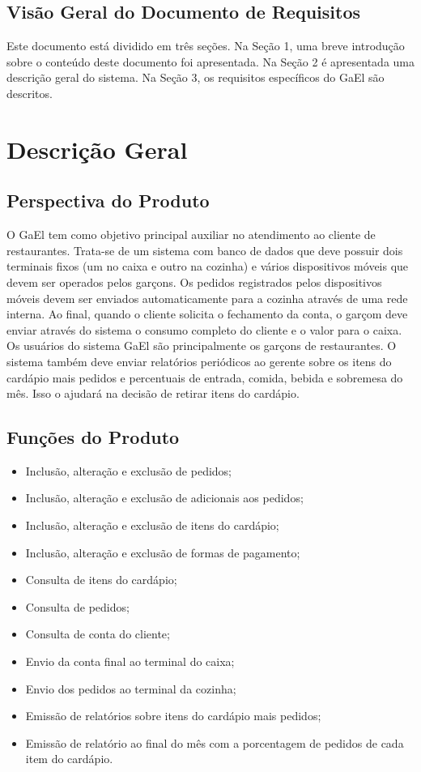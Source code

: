 \documentclass[11pt,a4paper]{article}
\begin{document}
\subsection{Visão Geral do Documento de Requisitos}

Este documento está dividido em três seções. Na Seção 1, uma breve introdução sobre o conteúdo deste documento foi apresentada. Na Seção 2 é apresentada uma descrição geral do sistema. Na Seção 3, os requisitos específicos do GaEl são descritos.

\section{Descrição Geral}

\subsection{Perspectiva do Produto}

O GaEl tem como objetivo principal auxiliar no atendimento ao cliente de restaurantes. Trata-se de um sistema com banco de dados que deve possuir dois terminais fixos (um no caixa e outro na cozinha) e vários dispositivos móveis que devem ser operados pelos garçons. Os pedidos registrados pelos dispositivos móveis devem ser enviados automaticamente para a cozinha através de uma rede interna. Ao final, quando o cliente solicita o fechamento da conta, o garçom deve enviar através do sistema o consumo completo do cliente e o valor para o caixa. Os usuários do sistema GaEl são principalmente os garçons de restaurantes. O sistema também deve enviar relatórios periódicos ao gerente sobre os itens do cardápio mais pedidos e percentuais de entrada, comida, bebida e sobremesa do mês. Isso o ajudará na decisão de retirar itens do cardápio.

\subsection{Funções do Produto}

\begin{itemize}
\item Inclusão, alteração e exclusão de pedidos;
\item Inclusão, alteração e exclusão de adicionais aos pedidos;
\item Inclusão, alteração e exclusão de itens do cardápio;
\item Inclusão, alteração e exclusão de formas de pagamento;
\item Consulta de itens do cardápio;
\item Consulta de pedidos;
\item Consulta de conta do cliente;
\item Envio da conta final ao terminal do caixa;
\item Envio dos pedidos ao terminal da cozinha;
\item Emissão de relatórios sobre itens do cardápio mais pedidos;
\item Emissão de relatório ao final do mês com a porcentagem de pedidos de cada item do cardápio.
\end{itemize}
\end{document}
